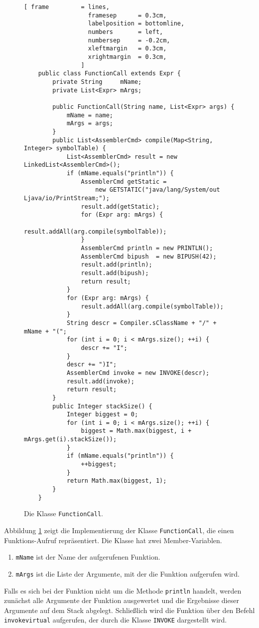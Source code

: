 \begin{figure}[!ht]
\centering
\begin{Verbatim}[ frame         = lines, 
                  framesep      = 0.3cm, 
                  labelposition = bottomline,
                  numbers       = left,
                  numbersep     = -0.2cm,
                  xleftmargin   = 0.3cm,
                  xrightmargin  = 0.3cm,
                ]
    public class FunctionCall extends Expr {
        private String     mName;
        private List<Expr> mArgs;
    
        public FunctionCall(String name, List<Expr> args) {
            mName = name;
            mArgs = args;
        }
        public List<AssemblerCmd> compile(Map<String, Integer> symbolTable) {
            List<AssemblerCmd> result = new LinkedList<AssemblerCmd>();
            if (mName.equals("println")) { 
                AssemblerCmd getStatic = 
                    new GETSTATIC("java/lang/System/out Ljava/io/PrintStream;");
                result.add(getStatic);
                for (Expr arg: mArgs) {
                    result.addAll(arg.compile(symbolTable));
                }
                AssemblerCmd println = new PRINTLN();
                AssemblerCmd bipush  = new BIPUSH(42);
                result.add(println);
                result.add(bipush);
                return result;
            }
            for (Expr arg: mArgs) {
                result.addAll(arg.compile(symbolTable));
            }
            String descr = Compiler.sClassName + "/" + mName + "(";
            for (int i = 0; i < mArgs.size(); ++i) {
                descr += "I";
            }
            descr += ")I";
            AssemblerCmd invoke = new INVOKE(descr);
            result.add(invoke);
            return result;
        }
        public Integer stackSize() {
            Integer biggest = 0;
            for (int i = 0; i < mArgs.size(); ++i) {
                biggest = Math.max(biggest, i + mArgs.get(i).stackSize());
            }
            if (mName.equals("println")) {
                ++biggest;
            }
            return Math.max(biggest, 1);
        }
    }
\end{Verbatim}
\vspace*{-0.3cm}
\caption{Die Klasse \texttt{FunctionCall}.}
\label{fig:Expr:FunctionCall.java}
\end{figure}

Abbildung \ref{fig:Expr:FunctionCall.java} zeigt die Implementierung der Klasse
\texttt{FunctionCall}, die einen Funktions-Aufruf repr\"asentiert.  Die Klasse hat zwei
Member-Variablen.
\begin{enumerate}
\item \texttt{mName} ist der Name der aufgerufenen Funktion.
\item \texttt{mArgs} ist die Liste der Argumente, mit der die Funktion aufgerufen wird.
\end{enumerate}
Falls es sich bei der Funktion nicht um die Methode \texttt{println} handelt, werden zun\"achst alle
Argumente der Funktion ausgewertet und die Ergebnisse dieser Argumente auf dem Stack abgelegt.
Schlie{\ss}lich wird die Funktion \"uber den Befehl \texttt{invokevirtual} aufgerufen, der durch die
Klasse \texttt{INVOKE} dargestellt wird.

